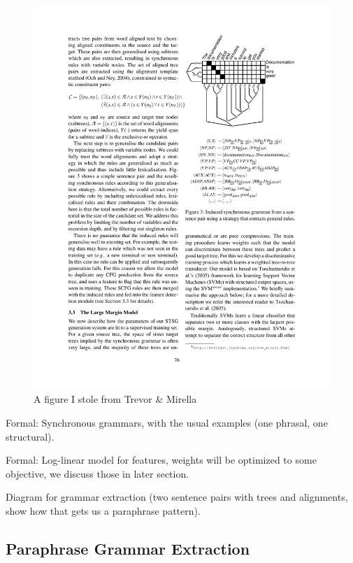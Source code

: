 \documentclass[11pt]{article}
\begin{document}
\begin{figure}
\begin{center}
\includegraphics[width=0.99\linewidth]{figures/tree_placeholder.pdf}
\end{center}
\caption{A figure I stole from Trevor \& Mirella}
\end{figure}


Formal: Synchronous grammars, with the usual examples (one phrasal, one
structural).

Formal: Log-linear model for features, weights will be optimized to some
objective, we discuss those in later section.

Diagram for grammar extraction (two sentence pairs with trees and
alignments, show how that gets us a paraphrase pattern). 



\subsection{Paraphrase Grammar Extraction} \label{extraction}
\end{document}

